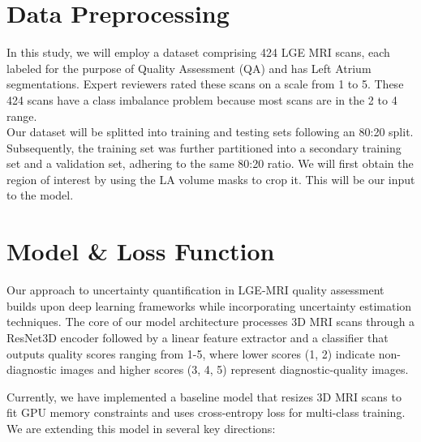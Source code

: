 \documentclass{report}
\begin{document}
\section*{Data Preprocessing}
In this study, we will employ a dataset comprising 424 LGE MRI scans, each labeled for the purpose of Quality Assessment (QA) and has Left Atrium segmentations.  Expert reviewers rated these scans on a scale from 1 to 5. These 424 scans have a class imbalance problem because most scans are in the 2 to 4 range. \\
Our dataset will be splitted into training and testing sets following an 80:20 split. Subsequently, the training set was further partitioned into a secondary training set and a validation set, adhering to the same 80:20 ratio.
We will first obtain the region of interest by using the LA volume masks to crop it. This will be our input to the model.

\section*{Model \& Loss Function}

Our approach to uncertainty quantification in LGE-MRI quality assessment builds upon deep learning frameworks while incorporating uncertainty estimation techniques. The core of our model architecture processes 3D MRI scans through a ResNet3D encoder followed by a linear feature extractor and a classifier that outputs quality scores ranging from 1-5, where lower scores (1, 2) indicate non-diagnostic images and higher scores (3, 4, 5) represent diagnostic-quality images.

Currently, we have implemented a baseline model that resizes 3D MRI scans to fit GPU memory constraints and uses cross-entropy loss for multi-class training. We are extending this model in several key directions:
\end{document}
